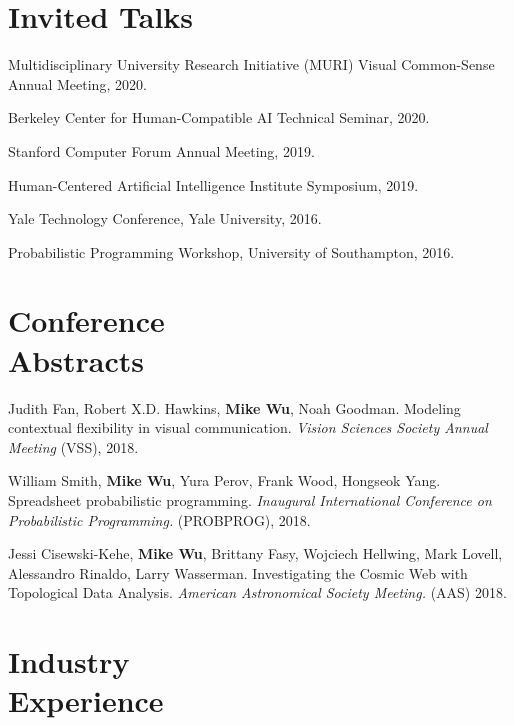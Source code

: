 \documentclass[margin, 10pt]{res} %
\begin{document}
\begin{resume}

\section{Invited Talks}

Multidisciplinary University Research Initiative (MURI) Visual Common-Sense Annual Meeting, 2020.

Berkeley Center for Human-Compatible AI Technical Seminar, 2020.

Stanford Computer Forum Annual Meeting, 2019.

Human-Centered Artificial Intelligence Institute Symposium, 2019.

Yale Technology Conference, Yale University, 2016.

Probabilistic Programming Workshop, University of Southampton, 2016.

\section{Conference \\ Abstracts}

Judith Fan, Robert X.D. Hawkins, \textbf{Mike Wu}, Noah Goodman. Modeling contextual flexibility in visual communication. \textit{Vision Sciences Society Annual Meeting} (VSS), 2018.

William Smith, \textbf{Mike Wu}, Yura Perov, Frank Wood, Hongseok Yang. Spreadsheet probabilistic programming. \textit{Inaugural International Conference on Probabilistic Programming.} (PROBPROG), 2018.

Jessi Cisewski-Kehe, \textbf{Mike Wu}, Brittany Fasy, Wojciech Hellwing, Mark Lovell, Alessandro Rinaldo, Larry Wasserman. Investigating the Cosmic Web with Topological Data Analysis. \textit{American Astronomical Society Meeting.} (AAS) 2018.


\section{Industry \\ Experience}


\end{resume}
\end{document}
